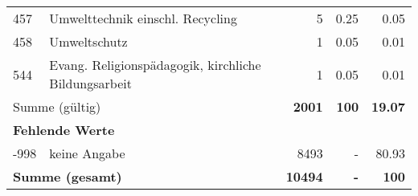 \begin{longtable}{lXrrr}
        457 & \multicolumn{1}{X}{Umwelttechnik einschl. Recycling} & %
          \num{5} &
          \num[round-mode=places,round-precision=2]{0.25} &
          \num[round-mode=places,round-precision=2]{0.05} \\

        458 & \multicolumn{1}{X}{Umweltschutz} & %
          \num{1} &
          \num[round-mode=places,round-precision=2]{0.05} &
          \num[round-mode=places,round-precision=2]{0.01} \\

        544 & \multicolumn{1}{X}{Evang. Religionspädagogik, kirchliche Bildungsarbeit} & %
          \num{1} &
          \num[round-mode=places,round-precision=2]{0.05} &
          \num[round-mode=places,round-precision=2]{0.01} \\

     \midrule
     \multicolumn{2}{l}{Summe (gültig)} &
       \textbf{\num{2001}} &
     \textbf{\num{100}} &
       \textbf{\num[round-mode=places,round-precision=2]{19.07}} \\
     \multicolumn{5}{l}{\textbf{Fehlende Werte}}\\
       -998 &
       keine Angabe &
         \num{8493} &
        - &
         \num[round-mode=places,round-precision=2]{80.93} \\
     \midrule
     \multicolumn{2}{l}{\textbf{Summe (gesamt)}} &
          \textbf{\num{10494}} &
        \textbf{-} &
        \textbf{\num{100}} \\
     \bottomrule
     \end{longtable}
     
